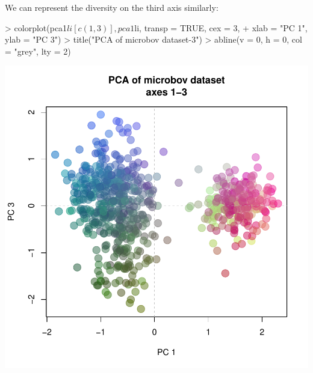 \documentclass{article}
\begin{document}
We can represent the diversity on the third axis similarly:
\begin{Schunk}
\begin{Sinput}
> colorplot(pca1$li[c(1, 3)], pca1$li, transp = TRUE, cex = 3, 
+     xlab = "PC 1", ylab = "PC 3")
> title("PCA of microbov dataset-3")
> abline(v = 0, h = 0, col = "grey", lty = 2)
\end{Sinput}
\end{Schunk}
\includegraphics{figs/base-075}





\end{document}
